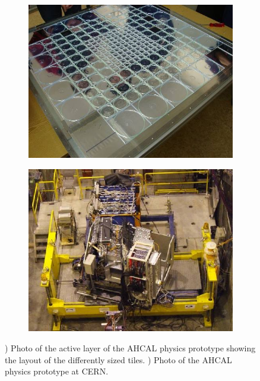 \begin{figure}[htbp!]
  \centering
  \begin{subfigure}[t]{0.49\textwidth}
    \includegraphics[width=1.\linewidth]{chap3/fig/moduleinside.png}
    \caption{} \label{fig:AHCALPhysics}
  \end{subfigure}
  \hfill
  \begin{subfigure}[t]{0.49\textwidth}
    \includegraphics[width=1.\linewidth]{chap3/fig/CERN_setup.png}
    \caption{} \label{fig:AHCALPhysics2}
  \end{subfigure}
  \caption{) Photo of the active layer of the AHCAL physics prototype showing the layout of the differently sized tiles. ) Photo of the AHCAL physics prototype at CERN.}
\end{figure}

